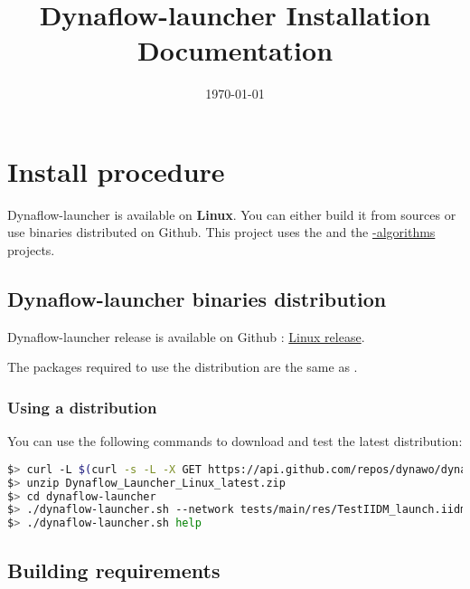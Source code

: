 \documentclass[a4paper, 12pt]{report}
\begin{document}
\title{Dynaflow-launcher Installation Documentation}
\date\today

\maketitle
\tableofcontents

\chapter{Install procedure}

Dynaflow-launcher is available on \textbf{Linux}.
You can either build it from sources or use binaries distributed on Github.
This project uses the \href{https://github.com/dynawo/dynawo}{\Dynawo}  and the \href{https://github.com/dynawo/dynawo-algorithms}{\Dynawo-algorithms} projects.

\section{Dynaflow-launcher binaries distribution}

Dynaflow-launcher release is available on Github : \href{https://github.com/dynawo/dynaflow-launcher/releases/download/v1.3.0/Dynaflow_Launcher_Linux_v1.3.0.zip}{Linux release}.

The packages required to use the distribution are the same as \Dynawo.

\subsection{Using a distribution}

You can use the following commands to download and test the latest distribution:
\begin{lstlisting}[language=bash, breaklines=true, breakatwhitespace=false, columns=fullflexible]
$> curl -L $(curl -s -L -X GET https://api.github.com/repos/dynawo/dynaflow-launcher/releases/latest | grep "Dynaflow_Launcher_Linux" | grep url | cut -d '"' -f 4) -o Dynaflow_Launcher_Linux_latest.zip
$> unzip Dynaflow_Launcher_Linux_latest.zip
$> cd dynaflow-launcher
$> ./dynaflow-launcher.sh --network tests/main/res/TestIIDM_launch.iidm --config tests/main/res/config_launch.json
$> ./dynaflow-launcher.sh help
\end{lstlisting}

\section{Building requirements}
\end{document}
